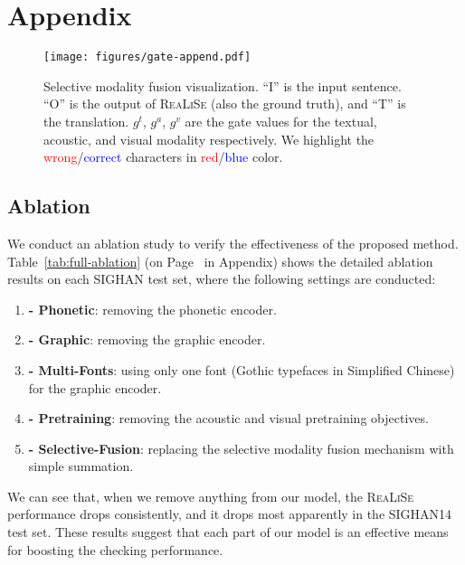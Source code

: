 \documentclass[11pt,a4paper]{article}
\newcommand\model{\textsc{ReaLiSe}}
\begin{document}



\clearpage

\appendix
\section{Appendix}

\begin{figure}[t]
    \centering
    \texttt{[image: figures/gate-append.pdf]}
    \caption{Selective modality fusion visualization. ``I'' is the input sentence. ``O'' is the output of \model{} (also the ground truth), and ``T'' is the translation. $g^t$, $g^a$, $g^v$ are the gate values for the textual, acoustic, and visual modality respectively. We highlight the \textcolor{red}{wrong}/\textcolor{blue}{correct} characters in \textcolor{red}{red}/\textcolor{blue}{blue} color.}
    \label{fig:gate-apd}
\end{figure}


\subsection{Ablation}
\label{apd:ablation}
We conduct an ablation study to verify the effectiveness of the proposed method.
Table~\ref{tab:full-ablation} (on Page~\pageref{tab:full-ablation} in Appendix) shows the detailed ablation results on each SIGHAN test set, where the following settings are conducted:
\begin{enumerate}
    \item \textbf{- Phonetic}: removing the phonetic encoder.
    \item \textbf{- Graphic}: removing the graphic encoder.
    \item \textbf{- Multi-Fonts}: using only one font (Gothic typefaces in Simplified Chinese) for the graphic encoder.
    \item \textbf{- Pretraining}: removing the acoustic and visual pretraining objectives.
    \item \textbf{- Selective-Fusion}: replacing the selective modality fusion mechanism with simple summation.
\end{enumerate}

We can see that, when we remove anything from our model, the \model{} performance drops consistently, and it drops most apparently in the SIGHAN14 test set.
These results suggest that each part of our model is an effective means for boosting the checking performance.
\end{document}

